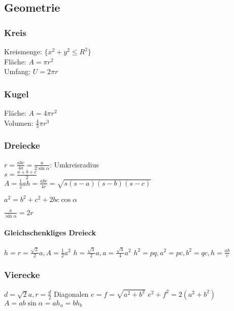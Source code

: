     \subsection{Geometrie}
        \subsubsection{Kreis}
            Kreismenge: $\{x^2+y^2\leq R^2\}$ \\
            Fläche: $A=\pi r^2$\\
            Umfang: $U=2\pi r$
        \subsubsection{Kugel}
            Fläche: $A=4\pi r^2$ \\
            Volumen: $\frac{4}{3}\pi r^3$
        \subsubsection{Dreiecke}
            $r = \frac{abc}{4a} = \frac{a}{2\sin{\alpha}}$: Umkreisradius \\
            $s = \frac{a+b+c}{2}$ \\
            $A = \frac{1}{2}ah = \frac{abc}{4r} = \sqrt{s(s-a)(s-b)(s-c)}$
            \begin{theorem}[Cosinussatz]
                $a^{2} = b^{2} + c^{2} + 2bc\cos{\alpha}$
            \end{theorem}
            \begin{theorem}[Sinussatz]
                $\frac{a}{\sin{\alpha}} = 2r$
            \end{theorem}
            \paragraph{Gleichschenkliges Dreieck}
                $h = r = \frac{\sqrt{2}}{2}a, A = \frac{1}{2}a^{2}$
                $h = \frac{\sqrt{3}}{2}a, a= \frac{\sqrt{3}}{4}a^{2}$
                $h^{2} = pq, a^{2} = pc, b^{2} = qc, h = \frac{ab}{c}$
        \subsubsection{Vierecke}
                $d = \sqrt{2}a, r = \frac{d}{2}$
                Diagonalen $e = f= \sqrt{a^{2} + b^{2}}$
                $e^{2} + f^{2} = 2(a^{2} + b^{2})$ \\
                $A= ab\sin{\alpha} = ah_{a} = bh_{b}$
